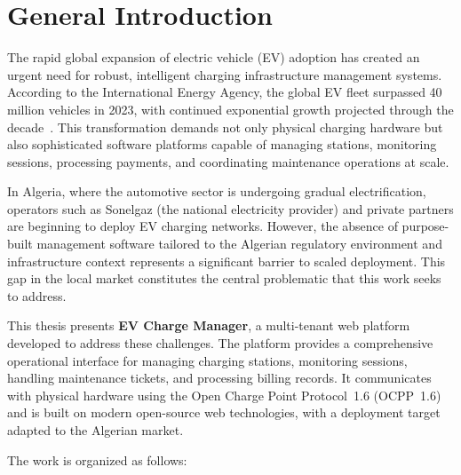 \documentclass[12pt,a4paper]{report}
\begin{document}
\clearpage
\hypersetup{pageanchor=true}


\chapter*{General Introduction}

The rapid global expansion of electric vehicle (EV) adoption has created an urgent need for
robust, intelligent charging infrastructure management systems. According to the International
Energy Agency, the global EV fleet surpassed 40 million vehicles in 2023, with continued
exponential growth projected through the decade~\autocite{iea_ev_outlook_2024}. This transformation
demands not only physical charging hardware but also sophisticated software platforms capable of
managing stations, monitoring sessions, processing payments, and coordinating maintenance
operations at scale.

In Algeria, where the automotive sector is undergoing gradual electrification, operators such as
Sonelgaz (the national electricity provider) and private partners are beginning to deploy EV
charging networks. However, the absence of purpose-built management software tailored to the
Algerian regulatory environment and infrastructure context represents a significant barrier to
scaled deployment. This gap in the local market constitutes the central problematic that this
work seeks to address.

This thesis presents \textbf{EV Charge Manager}, a multi-tenant web platform developed to address
these challenges. The platform provides a comprehensive operational interface for managing charging
stations, monitoring sessions, handling maintenance tickets, and processing billing records. It
communicates with physical hardware using the Open Charge Point Protocol~1.6
(OCPP~1.6)~\autocite{ocpp16_ed2} and is built on modern open-source web technologies, with a
deployment target adapted to the Algerian market.

The work is organized as follows:
\end{document}
